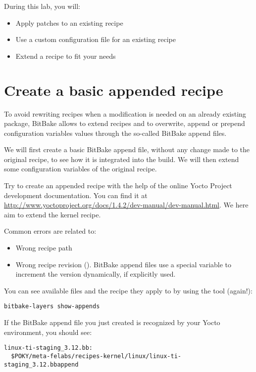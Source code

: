 
During this lab, you will:
\begin{itemize}
  \item Apply patches to an existing recipe
  \item Use a custom configuration file for an existing recipe
  \item Extend a recipe to fit your needs
\end{itemize}

\section{Create a basic appended recipe}

To avoid rewriting recipes when a modification is needed on an already existing
package, BitBake allows to extend recipes and to overwrite, append or prepend
configuration variables values through the so-called BitBake append files.

We will first create a basic BitBake append file, without any change made
to the original recipe, to see how it is integrated into the build. We will then
extend some configuration variables of the original recipe.

Try to create an appended recipe with the help of the online Yocto
Project development documentation. You can find it at
\url{http://www.yoctoproject.org/docs/1.4.2/dev-manual/dev-manual.html}. We here
aim to extend the  kernel recipe.

Common errors are related to:
\begin{itemize}
  \item Wrong recipe path
  \item Wrong recipe revision (). BitBake append files use a special
  variable to increment the version dynamically, if explicitly used.
\end{itemize}

You can see available  files and the recipe they apply to by
using the  tool (again!):
\begin{verbatim}
bitbake-layers show-appends
\end{verbatim}

If the BitBake append file you just created is recognized by your Yocto
environment, you should see:
\begin{verbatim}
linux-ti-staging_3.12.bb:
  $POKY/meta-felabs/recipes-kernel/linux/linux-ti-staging_3.12.bbappend
\end{verbatim}

